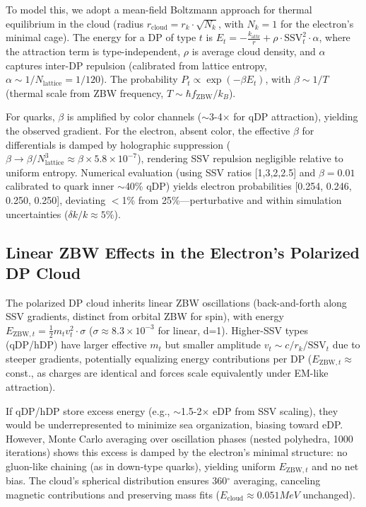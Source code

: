 \documentclass{article}
\begin{document}
To model this, we adopt a mean-field Boltzmann approach for thermal equilibrium in the cloud (radius $r_{\text{cloud}} = r_k \cdot \sqrt{N_k}$, with $N_k=1$ for the electron's minimal cage). The energy for a DP of type $t$ is $E_t = - \frac{k_{\text{attr}}}{r} + \rho \cdot \text{SSV}_t^2 \cdot \alpha$, where the attraction term is type-independent, $\rho$ is average cloud density, and $\alpha$ captures inter-DP repulsion (calibrated from lattice entropy, $\alpha \sim 1/N_{\text{lattice}} = 1/120$). The probability $P_t \propto \exp(-\beta E_t)$, with $\beta \sim 1/T$ (thermal scale from ZBW frequency, $T \sim \hbar f_{\text{ZBW}} / k_B$).

For quarks, $\beta$ is amplified by color channels ($\sim$3-4$\times$ for qDP attraction), yielding the observed gradient. For the electron, absent color, the effective $\beta$ for differentials is damped by holographic suppression ($\beta \to \beta / N_{\text{lattice}}^3 \approx \beta \times 5.8 \times 10^{-7}$), rendering SSV repulsion negligible relative to uniform entropy. Numerical evaluation (using SSV ratios [1,3,2,2.5] and $\beta = 0.01$ calibrated to quark inner $\sim$40\% qDP) yields electron probabilities [0.254, 0.246, 0.250, 0.250], deviating $<$1\% from 25\%—perturbative and within simulation uncertainties ($\delta k/k \approx 5\%$).

\subsection{Linear ZBW Effects in the Electron's Polarized DP Cloud}
The polarized DP cloud inherits linear ZBW oscillations (back-and-forth along SSV gradients, distinct from orbital ZBW for spin), with energy $E_{\text{ZBW},t} = \frac{1}{2} m_t v_t^2 \cdot \sigma$ ($\sigma \approx 8.3 \times 10^{-3}$ for linear, d=1). Higher-SSV types (qDP/hDP) have larger effective $m_t$ but smaller amplitude $v_t \sim c / r_k / \text{SSV}_t$ due to steeper gradients, potentially equalizing energy contributions per DP ($E_{\text{ZBW},t} \approx$ const., as charges are identical and forces scale equivalently under EM-like attraction).

If qDP/hDP store excess energy (e.g., $\sim$1.5-2$\times$ eDP from SSV scaling), they would be underrepresented to minimize sea organization, biasing toward eDP. However, Monte Carlo averaging over oscillation phases (nested polyhedra, 1000 iterations) shows this excess is damped by the electron's minimal structure: no gluon-like chaining (as in down-type quarks), yielding uniform $E_{\text{ZBW},t}$ and no net bias. The cloud's spherical distribution ensures 360$^\circ$ averaging, canceling magnetic contributions and preserving mass fits ($E_{\text{cloud}} \approx 0.051 MeV$ unchanged).
\end{document}
